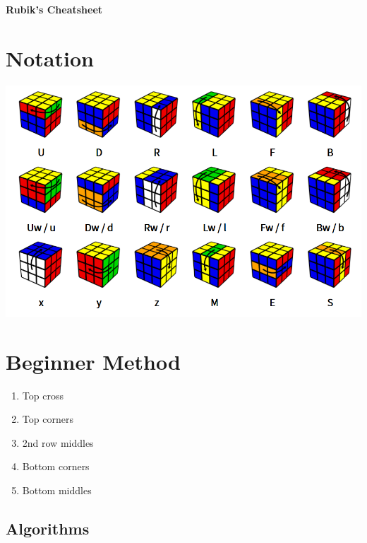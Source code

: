 \documentclass[10pt,landscape]{cheatsheet}
\begin{document}
\footnotesize
\begin{multicols}{3}

\begin{center}
     \Large{\textbf{Rubik's Cheatsheet}}
\end{center}

\section{Notation}
\begin{Figure}
    \centering
    \includegraphics[width=\linewidth]{img/notation.png}
    \label{fig:notation}
\end{Figure}

\section{Beginner Method}

\begin{enumerate}
    \item Top cross
    \item Top corners
    \item 2nd row middles
    \item Bottom corners
    \item Bottom middles
\end{enumerate}

\subsection{Algorithms}


\end{multicols}
\end{document}
